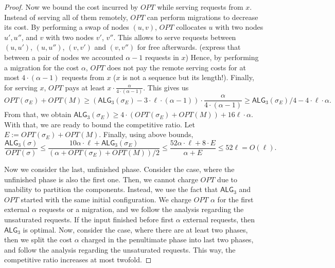 \documentclass[manuscript,screen=true]{acmart}
\newcommand{\OPT}{\mathit{OPT}}
\newcommand{\TAlg}{{\ensuremath{\textsf{ALG}_{3}}}\xspace} %
\begin{document}
\begin{proof}
  Now we bound the cost incurred by $\OPT$ while serving requests from $x$.
  Instead of serving all of them remotely, $\OPT$ can perform migrations to decrease its cost.
  By performing a swap of nodes $(u,v)$, $\OPT$ collocates $u$ with two nodes $u', u''$, and $v$ with two nodes $v'$, $v''$.
  This allows to serve requests between $(u,u')$, $(u,u'')$, $(v,v')$ and $(v,v'')$ for free afterwards.
  (express that between a pair of nodes we accounted $\alpha-1$ requests in $x$)
  Hence, by performing a migration for the cost $\alpha$, $\OPT$ does not pay the remote serving costs for at most $4\cdot (\alpha - 1)$ requests from $x$ ($x$ is not a sequence but its length!).
  Finally, for serving $x$, $\OPT$ pays at least $x \cdot \frac{\alpha}{4\cdot (\alpha-1)}$.
  This gives us
  \begin{equation*}
    \OPT(\sigma_E) + \OPT(M)  \geq (\TAlg(\sigma_E)-3\cdot\ell\cdot(\alpha - 1)) \cdot \frac{\alpha}{4\cdot (\alpha-1)}
    \geq \TAlg(\sigma_E) / 4 - 4\cdot \ell \cdot \alpha.
  \end{equation*}
  From that, we obtain $\TAlg(\sigma_E) \geq 4\cdot(\OPT(\sigma_E)+\OPT(M)) + 16\ell \cdot \alpha$.
  With that, we are ready to bound the competitive ratio.
  Let $E := \OPT(\sigma_E) + \OPT(M)$. Finally, using above bounds,
  \begin{equation*}
    \frac{\TAlg(\sigma)}{\OPT(\sigma)} \leq \frac{10\alpha \cdot \ell + \TAlg(\sigma_E)}{(\alpha + \OPT(\sigma_E) + \OPT(M))/2} \leq \frac{52\alpha\cdot\ell + 8\cdot E}{\alpha + E} \leq 52 \ell = O(\ell).
  \end{equation*}

  \medskip

  Now we consider the last, unfinished phase.
  Consider the case, where the unfinished phase is also the first one.
  Then, we cannot charge $\OPT$ due to unability to partition the components.
  Instead, we use the fact that \TAlg and $\OPT$ started with the same initial configuration.
  We charge $\OPT$ $\alpha$ for the first external $\alpha$ requests or a migration,
  and we follow the analysis regarding the unsaturated requests.
  If the input finished before first $\alpha$ external requests, then \TAlg is optimal.
  Now, consider the case, where there are at least two phases, then we split the cost $\alpha$ charged in the penultimate phase into last two phases, and follow the analysis regarding the unsaturated requests.
  This way, the competitive ratio increases at most twofold.
\end{proof}
\end{document}
